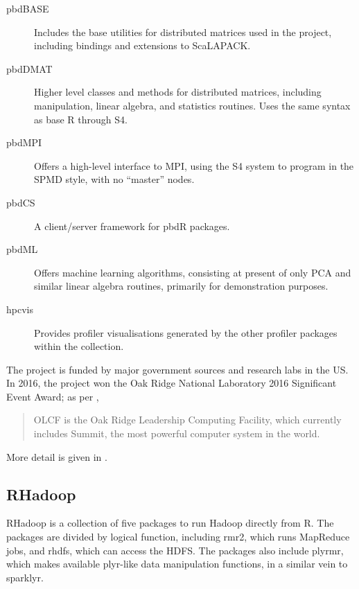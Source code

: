 \begin{description}

    \item[pbdBASE]
        Includes the base utilities for distributed matrices used in the
        project, including bindings and extensions to
        ScaLAPACK\cite{pbdBASEpackage}.
    \item[pbdDMAT]
        Higher level classes and methods for distributed matrices, including
        manipulation, linear algebra, and statistics routines. Uses the same
        syntax as base R through S4\cite{pbdDMATpackage}.
    \item[pbdMPI]
        Offers a high-level interface to MPI, using the S4 system to program in
        the SPMD style, with no ``master'' nodes\cite{Chen2012pbdMPIpackage}.
    \item[pbdCS]
        A client/server framework for pbdR
        packages\cite{Schmidt2015pbdCSpackage}.
    \item[pbdML]
        Offers machine learning algorithms, consisting at present of only PCA
        and similar linear algebra routines, primarily for demonstration
        purposes\cite{schmidt20}.
    \item[hpcvis]
        Provides profiler visualisations generated by the other profiler
        packages within the collection\cite{hpcvis}.
\end{description}

The project is funded by major government sources and research labs in
the US. In 2016, the project won the Oak Ridge National Laboratory 2016
Significant Event Award; as per \cite{pbdR2012},

\begin{quote}
    OLCF is the Oak Ridge Leadership Computing Facility, which currently
    includes Summit, the most powerful computer system in the world.
\end{quote}

More detail is given in \cite{pbdBASEvignette}.

\hypertarget{sec:rhadoop}{%
    \subsection{RHadoop}\label{sec:rhadoop}}

RHadoop is a collection of five packages to run Hadoop directly from
R\cite{analytics:_rhadoop_wiki}. The packages are divided by logical
function, including rmr2, which runs MapReduce jobs, and rhdfs, which
can access the HDFS. The packages also include plyrmr, which makes
available plyr-like data manipulation functions, in a similar vein to
sparklyr.

